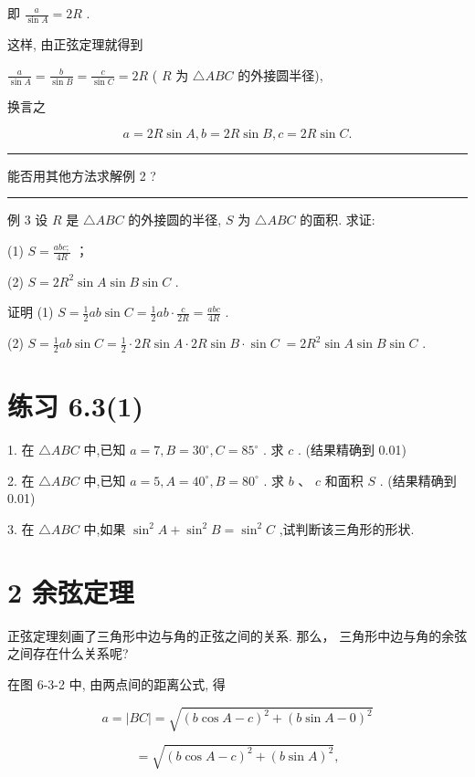 \documentclass[10pt]{article}
\newcommand{\HRule}{\begin{center}\rule{0.9\linewidth}{0.2mm}\end{center}}
\begin{document}
即 \(\frac{a}{\sin A} = {2R}\) .

这样, 由正弦定理就得到

\(\frac{a}{\sin A} = \frac{b}{\sin B} = \frac{c}{\sin C} = {2R}\) ( \(R\) 为 \(\bigtriangleup {ABC}\) 的外接圆半径),

换言之

\[
a = {2R}\sin A,b = {2R}\sin B,c = {2R}\sin C.
\]

\HRule

能否用其他方法求解例 2 ?

\HRule

例 3 设 \(R\) 是 \(\bigtriangleup {ABC}\) 的外接圆的半径, \(S\) 为 \(\bigtriangleup {ABC}\) 的面积. 求证:

(1) \(S = \frac{{abc};}{4R}\) ；

(2) \(S = {2{R}^{2}}\sin A\sin B\sin C\) .

证明 (1) \(S = \frac{1}{2}{ab}\sin C = \frac{1}{2}{ab} \cdot  \frac{c}{2R} = \frac{abc}{4R}\) .

(2) \(S = \frac{1}{2}{ab}\sin C = \frac{1}{2} \cdot  {2R}\sin A \cdot  {2R}\sin B \cdot  \sin C \; = 2{R}^{2}\sin A\sin B\sin C\) .

\section*{练习 6.3(1)}

1. 在 \(\bigtriangleup {ABC}\) 中,已知 \(a = 7,B = {30}^{ \circ  },C = {85}^{ \circ  }\) . 求 \(c\) . (结果精确到 0.01)

2. 在 \(\bigtriangleup {ABC}\) 中,已知 \(a = 5,A = {40}^{ \circ  },B = {80}^{ \circ  }\) . 求 \(b\text{ 、 }c\) 和面积 \(S\) . (结果精确到 0.01)

3. 在 \(\bigtriangleup {ABC}\) 中,如果 \({\sin }^{2}A + {\sin }^{2}B = {\sin }^{2}C\) ,试判断该三角形的形状.

\section*{2 余弦定理}

正弦定理刻画了三角形中边与角的正弦之间的关系. 那么， 三角形中边与角的余弦之间存在什么关系呢?

在图 6-3-2 中, 由两点间的距离公式, 得

\[
a = \left| {BC}\right|  = \sqrt{{\left( b\cos A - c\right) }^{2} + {\left( b\sin A - 0\right) }^{2}}
\]

\[
= \sqrt{{\left( b\cos A - c\right) }^{2} + {\left( b\sin A\right) }^{2}},
\]
\end{document}
